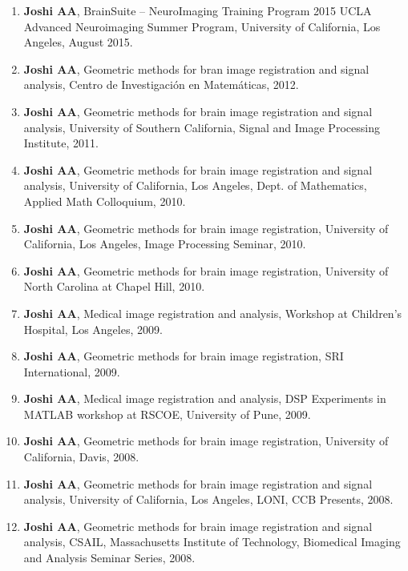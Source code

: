 \documentclass[overlapped,line,letterpaper]{res}
\begin{document}
\begin{resume}
\begin{enumerate}
    \item \textbf{Joshi AA}, BrainSuite – NeuroImaging Training Program 2015 UCLA Advanced Neuroimaging Summer Program, University of California, Los Angeles, August 2015.  

    \item \textbf{Joshi AA}, Geometric methods for bran image registration and signal analysis, Centro de Investigación en Matemáticas, 2012.

    \item \textbf{Joshi AA}, Geometric methods for brain image registration and signal analysis, University of Southern California, Signal and Image Processing Institute, 2011.

    \item \textbf{Joshi AA}, Geometric methods for brain image registration and signal analysis, University of California, Los Angeles, Dept. of Mathematics, Applied Math Colloquium, 2010.

    \item \textbf{Joshi AA}, Geometric methods for brain image registration, University of California, Los Angeles, Image Processing Seminar, 2010. 

    \item \textbf{Joshi AA}, Geometric methods for brain image registration, University of North Carolina at Chapel Hill, 2010. 

    \item \textbf{Joshi AA}, Medical image registration and analysis, Workshop at Children's Hospital, Los Angeles, 2009.

    \item \textbf{Joshi AA}, Geometric methods for brain image registration, SRI International, 2009. 

    \item \textbf{Joshi AA}, Medical image registration and analysis, DSP Experiments in MATLAB workshop at RSCOE, University of Pune, 2009.

    \item \textbf{Joshi AA}, Geometric methods for brain image registration, University of California, Davis, 2008.

    \item \textbf{Joshi AA}, Geometric methods for brain image registration and signal analysis, University of California, Los Angeles, LONI, CCB Presents, 2008.

    \item \textbf{Joshi AA}, Geometric methods for brain image registration and signal analysis, CSAIL, Massachusetts Institute of Technology, Biomedical Imaging and Analysis Seminar Series, 2008.


\end{enumerate}
\end{resume}
\end{document}
